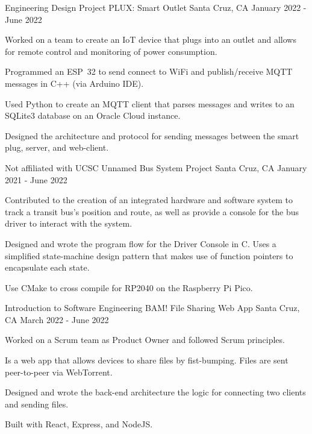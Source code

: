 \begin{cventries}
  \cventry
    {Engineering Design Project} %
    {PLUX: Smart Outlet} %
    {Santa Cruz, CA} %
    {January 2022 - June 2022} %
    {
      \begin{cvitems} %
        \item {Worked on a team to create an IoT device that plugs into an outlet and allows for remote control and monitoring of power consumption.}
        \item {Programmed an ESP~32 to send connect to WiFi and publish/receive MQTT messages in C++ (via Arduino IDE).}
        \item {Used Python to create an MQTT client that parses messages and writes to an SQLite3 database on an Oracle Cloud instance.}
        \item {Designed the architecture and protocol for sending messages between the smart plug, server, and web-client.}
      \end{cvitems}
    }

  \cventry
    {Not affiliated with UCSC} %
    {Unnamed Bus System Project} %
    {Santa Cruz, CA} %
    {January 2021 - June 2022} %
    {
      \begin{cvitems} %
      	\item {Contributed to the creation of an integrated hardware and software system to track a transit bus's position and  route, as well as provide a console for the bus driver to interact with the system.}
      	\item {Designed and wrote the program flow for the Driver Console in C. Uses a simplified state-machine design pattern that makes use of function pointers to encapsulate each state.}
      	\item {Use CMake to cross compile for RP2040 on the Raspberry Pi Pico.}
      \end{cvitems}
    }
    
  \cventry
    {Introduction to Software Engineering}
    {BAM! File Sharing Web App}
    {Santa Cruz, CA}
    {March 2022 - June 2022}
    {
        \begin{cvitems}
            \item {Worked on a Scrum team as Product Owner and followed Scrum principles.}
            \item {Is a web app that allows devices to share files by fist-bumping. Files are sent peer-to-peer via WebTorrent.}
            \item {Designed and wrote the back-end architecture the logic for connecting two clients and sending files.}
            \item {Built with React, Express, and NodeJS.}
        \end{cvitems}
    }


\end{cventries}
